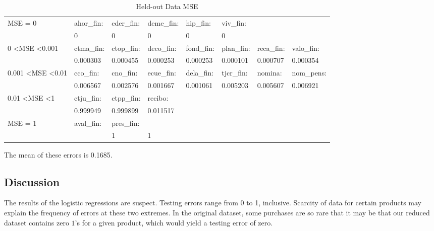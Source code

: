 \documentclass{article}
\begin{document}
\begin{spacing}{1}
\begin{large}
\begin{table}[h]\footnotesize
	\centering
	\caption{Held-out Data MSE}
	\label{my-label}
	\begin{tabular}{llllllll}
		\hline
		MSE = 0                            & ahor\_fin:  & cder\_fin: & deme\_fin: & hip\_fin:  & viv\_fin:  &                     &            \\
		& 0                    & 0          & 0          & 0          & 0          &                     &            \\ \hline
		0 \textless MSE \textless 0.001      & ctma\_fin:          & ctop\_fin: & deco\_fin: & fond\_fin: & plan\_fin: & reca\_fin:  & valo\_fin: \\
		& 0.000303            & 0.000455   & 0.000253   & 0.000253   & 0.000101   &  0.000707             & 0.000354   \\ \hline
		0.001 \textless MSE \textless 0.01 & cco\_fin:           & cno\_fin:  & ecue\_fin: & dela\_fin: & tjcr\_fin: & nomina:             & nom\_pens: \\
		& 0.006567            & 0.002576   & 0.001667   & 0.001061   & 0.005203   & 0.005607            & 0.006921   \\ \hline
		0.01 \textless MSE \textless 1     & ctju\_fin:          & ctpp\_fin: & recibo:    &            &            &                     &            \\
		& 0.999949            & 0.999899   & 0.011517   &            &            &                     &            \\ \hline
		MSE = 1                            & aval\_fin:          & pres\_fin: &            &            &            &                     &\\
		&                    & 1          &1           &            &            &                     & \\
		\hline
	\end{tabular}
\end{table}
The mean of these errors is 0.1685.

\subsection{Discussion}

The results of the logistic regressions are suspect. Testing errors range from 0 to 1, inclusive. Scarcity of data for certain products may explain the frequency of errors at these two extremes. In the original dataset, some purchases are so rare that it may be that our reduced dataset contains zero $1$'s for a given product, which would yield a testing error of zero.


\end{large}
\end{spacing}
\end{document}
